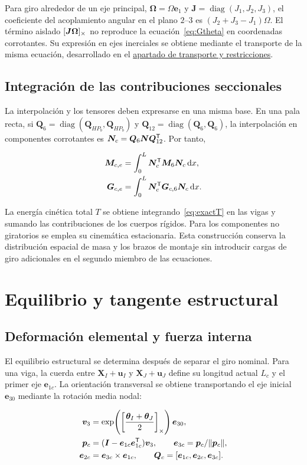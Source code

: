 Para giro alrededor de un eje principal, $\bm\Omega=\Omega\bm e_1$ y $\bm J=\operatorname{diag}(J_1,J_2,J_3)$, el coeficiente del acoplamiento angular en el plano $2$--$3$ es $(J_2+J_3-J_1)\Omega$. El término aislado $[\bm{J\Omega}]_\times$ no reproduce la ecuación~\eqref{eq:Gtheta} en coordenadas corrotantes. Su expresión en ejes inerciales se obtiene mediante el transporte de la misma ecuación, desarrollado en el \hyperref[sec:transporte]{apartado de transporte y restricciones}.

\subsection{Integración de las contribuciones seccionales}
La interpolación y los tensores deben expresarse en una misma base. En una pala recta, si $\bm Q_6=\operatorname{diag}(\bm Q_{HP_b},\bm Q_{HP_b})$ y $\bm Q_{12}=\operatorname{diag}(\bm Q_6,\bm Q_6)$, la interpolación en componentes corrotantes es $\bm N_c=\bm Q_6\bm N\bm Q_{12}^\mathsf T$. Por tanto,

\begin{align}
\bm M_{c,e}&=\int_0^L\bm N_c^\mathsf T\bm M_6\bm N_c\,\mathrm d x,\nonumber\\
\bm G_{c,e}&=\int_0^L\bm N_c^\mathsf T\bm G_{c,6}\bm N_c\,\mathrm d x.
\end{align}

La energía cinética total $T$ se obtiene integrando~\eqref{eq:exactT} en las vigas y sumando las contribuciones de los cuerpos rígidos. Para los componentes no giratorios se emplea su cinemática estacionaria. Esta construcción conserva la distribución espacial de masa y los brazos de montaje sin introducir cargas de giro adicionales en el segundo miembro de las ecuaciones.

\section{Equilibrio y tangente estructural}
\subsection{Deformación elemental y fuerza interna}
El equilibrio estructural se determina después de separar el giro nominal. Para una viga, la cuerda entre $\bm X_I+\bm u_I$ y $\bm X_J+\bm u_J$ define su longitud actual $L_c$ y el primer eje $\bm e_{1c}$. La orientación transversal se obtiene transportando el eje inicial $\bm e_{30}$ mediante la rotación media nodal:

\begin{align}
\bm v_3&=\exp\!\left(\left[\frac{\bm\theta_I+\bm\theta_J}{2}\right]_\times\right)\bm e_{30},\nonumber\\
\bm p_c&=(\bm I-\bm e_{1c}\bm e_{1c}^\mathsf T)\bm v_3,\qquad
\bm e_{3c}=\bm p_c/\|\bm p_c\|,\nonumber\\
\bm e_{2c}&=\bm e_{3c}\times\bm e_{1c},\qquad
\bm Q_c=[\bm e_{1c},\bm e_{2c},\bm e_{3c}].
\end{align}

